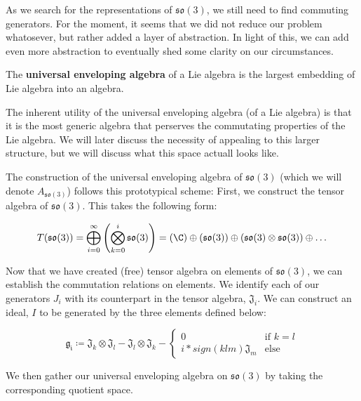 As we search for the representations of $\mathfrak{so}(3)$, we still need to find commuting generators. For the moment, it seems that we did not reduce our problem whatosever, but rather added a layer of abstraction. In light of this, we can add even more abstraction to eventually shed some clarity on our circumstances.

\begin{definition}
	The \textbf{universal enveloping algebra} of a Lie algebra is the largest embedding of Lie algebra into an algebra. 
\end{definition}

The inherent utility of the universal enveloping algebra (of a Lie algebra) is that it is the most generic algebra that perserves the commutating properties of the Lie algebra. We will later discuss the necessity of appealing to this larger structure, but we will discuss what this space actuall looks like. 

The construction of the universal enveloping algebra of $\mathfrak{so}(3)$ (which we will denote $A_{\mathfrak{so}(3)}$) follows this prototypical scheme: First, we construct the tensor algebra of $\mathfrak{so}(3)$. This takes the following form:

\begin{equation}
	\begin{aligned}
		T(\mathfrak{so}(3)) = \bigoplus_{i=0}^\infty \left(\bigotimes_{k=0}^i \mathfrak{so}(3)\right) = \left(\C\right) \oplus \left(\mathfrak{so}(3)\right) \oplus \left(\mathfrak{so}(3)\otimes \mathfrak{so}(3)\right) \oplus \hdots
	\end{aligned}
\end{equation} 

Now that we have created (free) tensor algebra on elements of $\mathfrak{so}(3)$, we can establish the commutation relations on elements. We identify each of our generators $J_i$ with its counterpart in the tensor algebra, $\mathfrak{J}_i$. We can construct an ideal, $I$ to be generated by the three elements defined below: 

$$\mathfrak{g_i} \coloneq \mathfrak{J}_k \otimes \mathfrak{J}_l - \mathfrak{J}_l\otimes \mathfrak{J}_k - \begin{cases}
	0 & \text{if }k=l	\\
	i*sign(klm) \mathfrak{J}_m &\text{else}
\end{cases}$$

We then gather our universal enveloping algebra on $\mathfrak{so}(3)$ by taking the corresponding quotient space.


